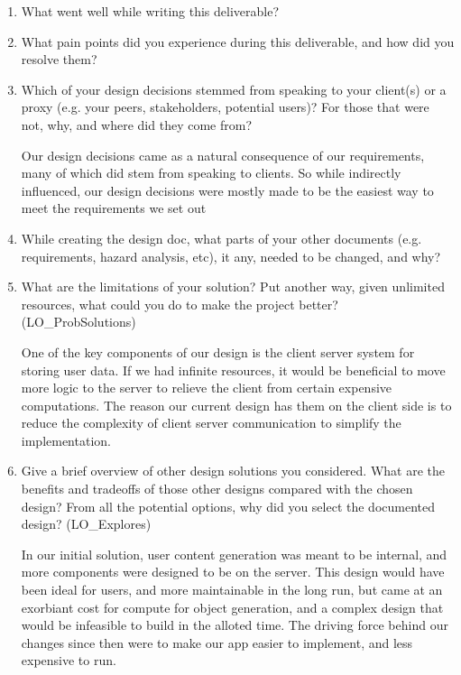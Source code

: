 \documentclass[12pt, titlepage]{article}
\begin{document}
\begin{enumerate}
  \item What went well while writing this deliverable?
  \item What pain points did you experience during this deliverable, and how
        did you resolve them?
  \item Which of your design decisions stemmed from speaking to your client(s)
        or a proxy (e.g. your peers, stakeholders, potential users)? For those that
        were not, why, and where did they come from?

        Our design decisions came as a natural consequence of our requirements, many of which did stem from speaking to clients.
        So while indirectly influenced, our design decisions were mostly made to be the easiest way to
        meet the requirements we set out

  \item While creating the design doc, what parts of your other documents (e.g.
        requirements, hazard analysis, etc), it any, needed to be changed, and why?
  \item What are the limitations of your solution?  Put another way, given
        unlimited resources, what could you do to make the project better? (LO\_ProbSolutions)

        One of the key components of our design is the client server system for storing user data.
        If we had infinite resources, it would be beneficial to move more logic to the server to relieve the client from certain expensive computations.
        The reason our current design has them on the client side is to reduce the complexity of client server communication to simplify the implementation.

  \item Give a brief overview of other design solutions you considered.  What
        are the benefits and tradeoffs of those other designs compared with the chosen
        design?  From all the potential options, why did you select the documented design?
        (LO\_Explores)

        In our initial solution, user content generation was meant to be internal,
        and more components were designed to be on the server. This design would have been ideal for users, and more maintainable in the long run,
        but came at an exorbiant cost for compute for object generation,
        and a complex design that would be infeasible to build in the alloted time.
        The driving force behind our changes since then were to make our app easier to implement,
        and less expensive to run.


\end{enumerate}
\end{document}
